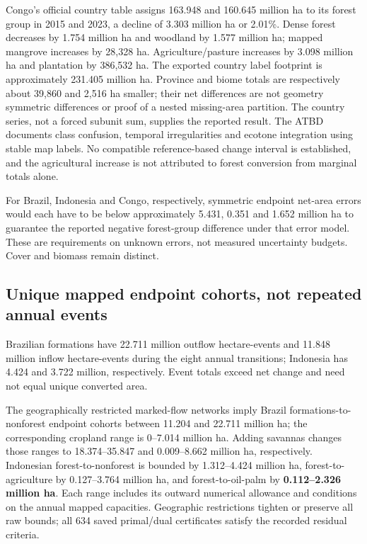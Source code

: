 Congo's official country table assigns 163.948 and 160.645 million ha to its forest group in 2015 and 2023, a decline of 3.303 million ha or 2.01\%. Dense forest decreases by 1.754 million ha and woodland by 1.577 million ha; mapped mangrove increases by 28,328 ha. Agriculture/pasture increases by 3.098 million ha and plantation by 386,532 ha. The exported country label footprint is approximately 231.405 million ha. Province and biome totals are respectively about 39,860 and 2,516 ha smaller; their net differences are not geometry symmetric differences or proof of a nested missing-area partition. The country series, not a forced subunit sum, supplies the reported result. The ATBD documents class confusion, temporal irregularities and ecotone integration using stable map labels. No compatible reference-based change interval is established, and the agricultural increase is not attributed to forest conversion from marginal totals alone.

For Brazil, Indonesia and Congo, respectively, symmetric endpoint net-area errors would each have to be below approximately 5.431, 0.351 and 1.652 million ha to guarantee the reported negative forest-group difference under that error model. These are requirements on unknown errors, not measured uncertainty budgets. Cover and biomass remain distinct.

\subsection{Unique mapped endpoint cohorts, not repeated annual events}\label{sec:flowresults}
Brazilian formations have 22.711 million outflow hectare-events and 11.848 million inflow hectare-events during the eight annual transitions; Indonesia has 4.424 and 3.722 million, respectively. Event totals exceed net change and need not equal unique converted area.

The geographically restricted marked-flow networks imply Brazil formations-to-nonforest endpoint cohorts between 11.204 and 22.711 million ha; the corresponding cropland range is 0--7.014 million ha. Adding savannas changes those ranges to 18.374--35.847 and 0.009--8.662 million ha, respectively. Indonesian forest-to-nonforest is bounded by 1.312--4.424 million ha, forest-to-agriculture by 0.127--3.764 million ha, and forest-to-oil-palm by \textbf{0.112--2.326 million ha}. Each range includes its outward numerical allowance and conditions on the annual mapped capacities. Geographic restrictions tighten or preserve all raw bounds; all 634 saved primal/dual certificates satisfy the recorded residual criteria.

